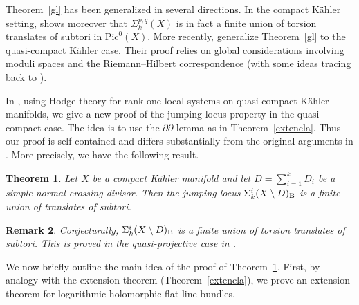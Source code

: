 \documentclass[english]{amsart}
\newcommand{\ddbar}{\partial\bar{\partial}}
\newcommand{\Pic}{\mathrm{Pic}}
\newtheorem{thm}{Theorem}[section]
\newtheorem{remark}[thm]{Remark}
\numberwithin{equation}{thm}
\begin{document}
Theorem~\ref{gl} has been generalized in several directions. In the compact K\"ahler setting, \cite{Sim93} shows moreover that $\Sigma^{p,q}_k(X)$ is in fact a finite union of torsion translates of subtori in $\Pic^0(X)$. More recently, \cite{BW15,BW20} generalize Theorem~\ref{gl} to the quasi-compact K\"ahler case. Their proof relies on global considerations involving moduli spaces and the Riemann--Hilbert correspondence (with some ideas tracing back to \cite{Sim93}).

In \cite{CDHP}, using Hodge theory for rank-one local systems on quasi-compact K\"ahler manifolds, we give a new proof of the jumping locus property in the quasi-compact case. The idea is to use the $\ddbar$-lemma as in Theorem~\ref{extencla}. Thus our proof is self-contained and differs substantially from the original arguments in \cite{BW15,BW20}. More precisely, we have the following result.

\begin{thm}\cite{BW20,CDHP}\label{jmp}
	Let $X$ be a compact K\"ahler manifold and let $D=\sum_{i=1}^{k} D_i$ be a simple normal crossing divisor. Then the jumping locus $\Sigma_k^i(X\setminus D)_{\rm B}$ is a finite union of translates of subtori.
\end{thm}

\begin{remark}
	Conjecturally, $\Sigma_k^i(X\setminus D)_{\rm B}$ is a finite union of torsion translates of subtori. This is proved in the quasi-projective case in \cite{BW15}.
\end{remark}

We now briefly outline the main idea of the proof of Theorem~\ref{jmp}. First, by analogy with the extension theorem (Theorem~\ref{extencla}), we prove an extension theorem for logarithmic holomorphic flat line bundles.
\end{document}
